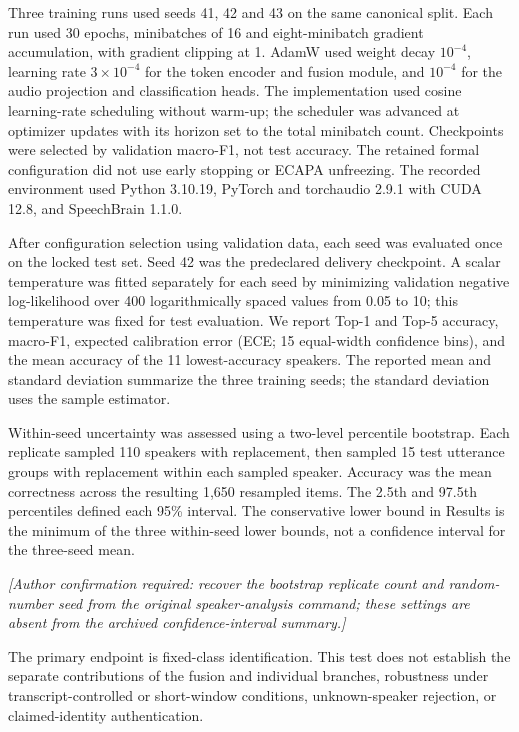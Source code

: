 \documentclass[final,5p,times,twocolumn]{elsarticle}
\begin{document}
Three training runs used seeds 41, 42 and 43 on the same canonical split. Each run used 30 epochs, minibatches of 16 and eight-minibatch gradient accumulation, with gradient clipping at 1. AdamW used weight decay $10^{-4}$, learning rate $3\times10^{-4}$ for the token encoder and fusion module, and $10^{-4}$ for the audio projection and classification heads. The implementation used cosine learning-rate scheduling without warm-up; the scheduler was advanced at optimizer updates with its horizon set to the total minibatch count. Checkpoints were selected by validation macro-F1, not test accuracy. The retained formal configuration did not use early stopping or ECAPA unfreezing. The recorded environment used Python 3.10.19, PyTorch and torchaudio 2.9.1 with CUDA 12.8, and SpeechBrain 1.1.0.

After configuration selection using validation data, each seed was evaluated once on the locked test set. Seed 42 was the predeclared delivery checkpoint. A scalar temperature was fitted separately for each seed by minimizing validation negative log-likelihood over 400 logarithmically spaced values from 0.05 to 10; this temperature was fixed for test evaluation. We report Top-1 and Top-5 accuracy, macro-F1, expected calibration error (ECE; 15 equal-width confidence bins), and the mean accuracy of the 11 lowest-accuracy speakers. The reported mean and standard deviation summarize the three training seeds; the standard deviation uses the sample estimator.

Within-seed uncertainty was assessed using a two-level percentile bootstrap. Each replicate sampled 110 speakers with replacement, then sampled 15 test utterance groups with replacement within each sampled speaker. Accuracy was the mean correctness across the resulting 1,650 resampled items. The 2.5th and 97.5th percentiles defined each 95\% interval. The conservative lower bound in Results is the minimum of the three within-seed lower bounds, not a confidence interval for the three-seed mean.

\noindent\textit{[Author confirmation required: recover the bootstrap replicate count and random-number seed from the original speaker-analysis command; these settings are absent from the archived confidence-interval summary.]}

The primary endpoint is fixed-class identification. This test does not establish the separate contributions of the fusion and individual branches, robustness under transcript-controlled or short-window conditions, unknown-speaker rejection, or claimed-identity authentication.
\end{document}
